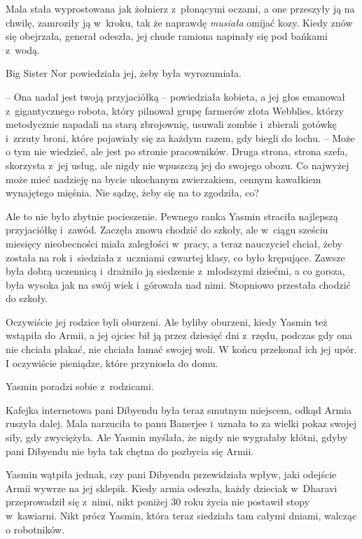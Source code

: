 \documentclass[oneside,polish,11pt,rmheadings]{mwbk}
\begin{document}
Mala stała wyprostowana jak żołnierz z~płonącymi oczami, a one przeszyły ją na chwilę, zamroziły ją w~kroku, tak że naprawdę \textit{musiała }omijać kozy. Kiedy znów się obejrzała, generał odeszła, jej chude ramiona napinały się pod bańkami z~wodą.

Big Sister Nor powiedziała jej, żeby była wyrozumiała.

-- Ona nadal jest twoją przyjaciółką -- powiedziała kobieta, a jej głos emanował z~gigantycznego robota, który pilnował grupę farmerów złota Webblies, którzy metodycznie napadali na starą zbrojownię, usuwali zombie i~zbierali gotówkę i~zrzuty broni, które pojawiały się za każdym razem, gdy biegli do lochu. -- Może o tym nie wiedzieć, ale jest po stronie pracowników. Druga strona, strona szefa, skorzysta z~jej usług, ale nigdy nie wpuszczą jej do swojego obozu. Co najwyżej może mieć nadzieję na bycie ukochanym zwierzakiem, cennym kawałkiem wynajętego mięśnia. Nie sądzę, żeby się na to zgodziła, co?

Ale to nie było zbytnie pocieszenie. Pewnego ranka Yasmin straciła najlepszą przyjaciółkę i~zawód. Zaczęła znowu chodzić do szkoły, ale w~ciągu sześciu miesięcy nieobecności miała zaległości w~pracy, a teraz nauczyciel chciał, żeby została na rok i~siedziała z~uczniami czwartej klasy, co było krępujące. Zawsze była dobrą uczennicą i~drażniło ją siedzenie z~młodszymi dziećmi, a co gorsza, była wysoka jak na swój wiek i~górowała nad nimi. Stopniowo przestała chodzić do szkoły.

Oczywiście jej rodzice byli oburzeni. Ale byliby oburzeni, kiedy Yasmin też wstąpiła do Armii, a jej ojciec bił ją przez dziesięć dni z~rzędu, podczas gdy ona nie chciała płakać, nie chciała łamać swojej woli. W końcu przekonał ich jej upór. I oczywiście pieniądze, które przyniosła do domu.

Yasmin poradzi sobie z~rodzicami.

Kafejka internetowa pani Dibyendu była teraz smutnym miejscem, odkąd Armia ruszyła dalej. Mala narzuciła to panu Banerjee i~uznała to za wielki pokaz swojej siły, gdy zwyciężyła. Ale Yasmin myślała, że nigdy nie wygrałaby kłótni, gdyby pani Dibyendu nie była tak chętna do pozbycia się Armii.

Yasmin wątpiła jednak, czy pani Dibyendu przewidziała wpływ, jaki odejście Armii wywrze na jej sklepik. Kiedy armia odeszła, każdy dzieciak w~Dharavi przeprowadził się z~nimi, nikt poniżej 30 roku życia nie postawił stopy w~kawiarni. Nikt prócz Yasmin, która teraz siedziała tam całymi dniami, walcząc o robotników.
\end{document}
